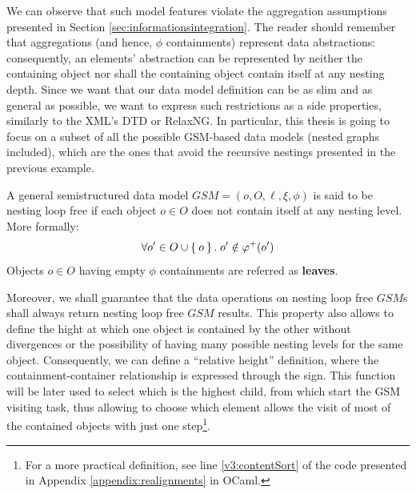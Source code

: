 We can observe that such model features violate the aggregation assumptions presented in Section \vref{sec:informationsintegration}. The reader should remember that aggregations (and hence, $\phi$ containments) represent data abstractions:  consequently, an elements' abstraction can be represented by neither the containing object  nor shall the containing object  contain itself at any nesting depth. Since we want that our data model definition can be as slim and as general as possible, we want to express such restrictions as a side properties, similarly to the XML's DTD or RelaxNG. In particular, this thesis is going to focus on a subset of all the possible GSM-based data models (nested graphs included), which are the ones that avoid the recursive nestings presented in the previous example.

\begin{axiom}
A general semistructured data model $GSM=(o,O,\ell,\xi,\phi)$ is said to be nesting loop free if each object $o\in O$ does not contain itself at any nesting level. More formally:
\[\forall o'\in O\cup\Set{o}.\; o'\notin \varphi^+(o')\]
Objects $o\in O$ having empty $\phi$ containments are referred as \textbf{leaves}.
\end{axiom}

Moreover, we shall guarantee that the data operations on nesting loop free $GSM$s shall always return nesting loop free $GSM$ results. This property also allows to define the hight at which one object is contained by the other without divergences or the possibility of having many possible nesting levels for the same object. Consequently, we can define a ``relative height'' definition, where the containment-container relationship is expressed through the sign. This function will be later used to select which is the highest child, from which start the GSM visiting task, thus allowing to choose which element allows the visit of most of the contained objects with just one step\footnote{For a more practical definition, see line \ref{v3:contentSort} of the code presented in Appendix \vref{appendix:realignments} in OCaml.}. 

